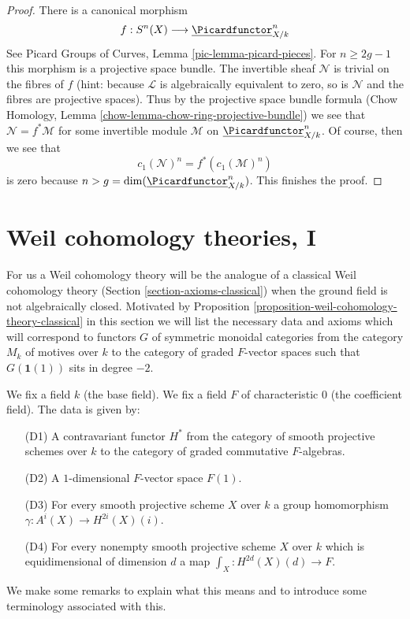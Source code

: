 \begin{proof}
\medskip\noindent
There is a canonical morphism
$$
f : S^n(X) \longrightarrow \underline{\Picardfunctor}^n_{X/k}
$$
See Picard Groups of Curves, Lemma \ref{pic-lemma-picard-pieces}.
For $n \geq 2g - 1$ this morphism is a projective space bundle.
The invertible sheaf $\mathcal{N}$ is trivial on the
fibres of $f$ (hint: because $\mathcal{L}$ is algebraically
equivalent to zero, so is $\mathcal{N}$ and the fibres are
projective spaces). Thus by the projective space bundle formula
(Chow Homology, Lemma \ref{chow-lemma-chow-ring-projective-bundle})
we see that $\mathcal{N} = f^*\mathcal{M}$ for some invertible
module $\mathcal{M}$ on $\underline{\Picardfunctor}^n_{X/k}$.
Of course, then we see that
$$
c_1(\mathcal{N})^n = f^*(c_1(\mathcal{M})^n)
$$
is zero because $n > g = \dim(\underline{\Picardfunctor}^n_{X/k})$.
This finishes the proof.
\end{proof}















\section{Weil cohomology theories, I}
\label{section-axioms}

\noindent
For us a Weil cohomology theory will be the analogue of a
classical Weil cohomology theory (Section \ref{section-axioms-classical})
when the ground field is not algebraically closed.
Motivated by Proposition \ref{proposition-weil-cohomology-theory-classical}
in this section we will list the necessary data and axioms which will
correspond to functors $G$ of symmetric monoidal categories from
the category $M_k$ of motives over $k$ to the category of
graded $F$-vector spaces such that $G(\mathbf{1}(1))$ sits in
degree $-2$.

\medskip\noindent
We fix a field $k$ (the base field).
We fix a field $F$ of characteristic $0$ (the coefficient field).
The data is given by:
\begin{enumerate}
\item[(D1)] A contravariant functor $H^*$ from the category
of smooth projective schemes over $k$ to the category of
graded commutative $F$-algebras.
\item[(D2)] A $1$-dimensional $F$-vector space $F(1)$.
\item[(D3)] For every smooth projective scheme $X$ over $k$
a group homomorphism $\gamma : A^i(X) \to H^{2i}(X)(i)$.
\item[(D4)] For every nonempty smooth projective scheme $X$ over $k$
which is equidimensional of dimension $d$ a map
$\int_X : H^{2d}(X)(d) \to F$.
\end{enumerate}
We make some remarks to explain what this means and to introduce
some terminology associated with this.

